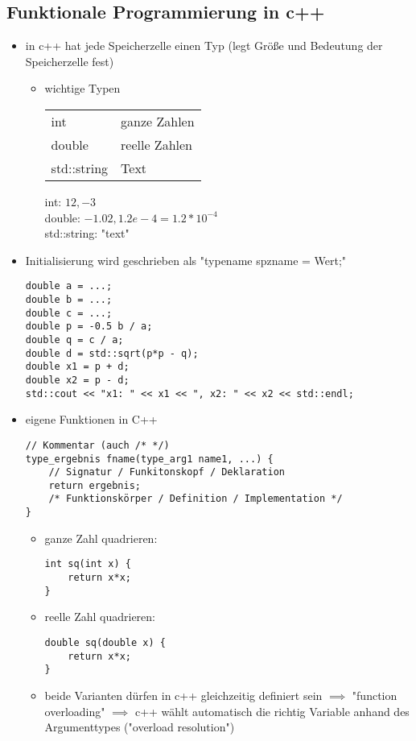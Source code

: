 \documentclass[a4paper]{scrartcl}
\begin{document}
\subsection{Funktionale Programmierung in c++}
\label{sec-6-3}
\begin{itemize}
\item in c++ hat jede Speicherzelle einen Typ (legt Größe und Bedeutung der Speicherzelle fest)
\begin{itemize}
\item wichtige Typen
\begin{center}
\begin{tabular}{ll}
int & ganze Zahlen\\
double & reelle Zahlen\\
std::string & Text\\
\end{tabular}
\end{center}
int: $12,-3$ \\
       double: $-1.02,1.2e-4 = 1.2*10^{-4}$ \\
       std::string: "text"
\end{itemize}
\item Initialisierung wird geschrieben als "typename spzname = Wert;"
\begin{verbatim}
double a = ...;
double b = ...;
double c = ...;
double p = -0.5 b / a;
double q = c / a;
double d = std::sqrt(p*p - q);
double x1 = p + d;
double x2 = p - d;
std::cout << "x1: " << x1 << ", x2: " << x2 << std::endl;
\end{verbatim}
\item eigene Funktionen in C++
\begin{verbatim}
// Kommentar (auch /* */)
type_ergebnis fname(type_arg1 name1, ...) {
	// Signatur / Funkitonskopf / Deklaration
	return ergebnis;
	/* Funktionskörper / Definition / Implementation */
}
\end{verbatim}
\begin{itemize}
\item ganze Zahl quadrieren:
\begin{verbatim}
int sq(int x) {
	return x*x;
}
\end{verbatim}
\item reelle Zahl quadrieren:
\begin{verbatim}
double sq(double x) {
	return x*x;
}
\end{verbatim}
\item beide Varianten dürfen in c++ gleichzeitig definiert sein $\implies$ "function overloading" $\implies$ c++ wählt automatisch die richtig Variable anhand des Argumenttypes ("overload resolution")

\end{itemize}
\end{itemize}
\end{document}
